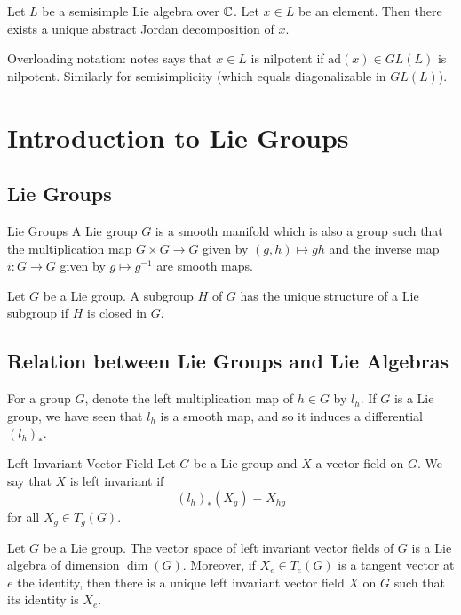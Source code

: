 \documentclass[a4paper]{article}
\begin{document}
\begin{crl}{}{} Let $L$ be a semisimple Lie algebra over $\mathbb{C}$. Let $x\in L$ be an element. Then there exists a unique abstract Jordan decomposition of $x$. 
\end{crl}

Overloading notation: notes says that $x\in L$ is nilpotent if $\text{ad}(x)\in GL(L)$ is nilpotent. Similarly for semisimplicity (which equals diagonalizable in $GL(L)$). 

\pagebreak
\section{Introduction to Lie Groups}
\subsection{Lie Groups}
\begin{defn}{Lie Groups}{} A Lie group $G$ is a smooth manifold which is also a group such that the multiplication map $G\times G\to G$ given by $(g,h)\mapsto gh$ and the inverse map $i:G\to G$ given by $g\mapsto g^{-1}$ are smooth maps. 
\end{defn}

\begin{prp}{}{} Let $G$ be a Lie group. A subgroup $H$ of $G$ has the unique structure of a Lie subgroup if $H$ is closed in $G$. 
\end{prp}

\subsection{Relation between Lie Groups and Lie Algebras}
For a group $G$, denote the left multiplication map of $h\in G$ by $l_h$. If $G$ is a Lie group, we have seen that $l_h$ is a smooth map, and so it induces a differential $(l_h)_\ast$. 

\begin{defn}{Left Invariant Vector Field}{} Let $G$ be a Lie group and $X$ a vector field on $G$. We say that $X$ is left invariant if $$(l_h)_\ast(X_g)=X_{hg}$$ for all $X_g\in T_g(G)$. 
\end{defn}

\begin{prp}{}{} Let $G$ be a Lie group. The vector space of left invariant vector fields of $G$ is a Lie algebra of dimension $\dim(G)$. Moreover, if $X_e\in T_e(G)$ is a tangent vector at $e$ the identity, then there is a unique left invariant vector field $X$ on $G$ such that its identity is $X_e$. 
\end{prp}
\end{document}
